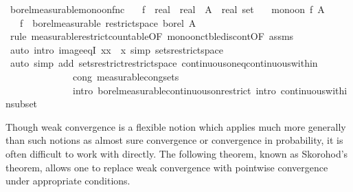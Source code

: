 \documentclass[leqno]{article}
\theoremstyle{definition}
\begin{document}
\medskip

\begin{isabellebody}
\isamarkupfalse%
\ borel{\isacharunderscore}measurable{\isacharunderscore}mono{\isacharunderscore}on{\isacharunderscore}fnc{\isacharcolon}\isanewline
\ \ \ f\ {\isacharcolon}{\isacharcolon}\ {\isachardoublequoteopen}real\ {\isasymRightarrow}\ real{\isachardoublequoteclose}\ \ A\ {\isacharcolon}{\isacharcolon}\ {\isachardoublequoteopen}real\ set{\isachardoublequoteclose}\isanewline
\ \ \ {\isachardoublequoteopen}mono{\isacharunderscore}on\ f\ A{\isachardoublequoteclose}\isanewline
\ \ \ {\isachardoublequoteopen}f\ {\isasymin}\ borel{\isacharunderscore}measurable\ {\isacharparenleft}restrict{\isacharunderscore}space\ borel\ A{\isacharparenright}{\isachardoublequoteclose}\isanewline
{}\isamarkupfalse%
\ {\isacharparenleft}rule\ measurable{\isacharunderscore}restrict{\isacharunderscore}countable{\isacharbrackleft}OF\ mono{\isacharunderscore}on{\isacharunderscore}ctble{\isacharunderscore}discont{\isacharbrackleft}OF\ assms{\isacharbrackright}{\isacharbrackright}{\isacharparenright}\isanewline
\ \ \isamarkupfalse%
\ {\isacharparenleft}auto\ intro{\isacharbang}{\isacharcolon}\ image{\isacharunderscore}eqI{\isacharbrackleft}\ x{\isacharequal}{\isachardoublequoteopen}{\isacharbraceleft}x{\isacharbraceright}{\isachardoublequoteclose}\ \ x{\isacharbrackright}\ simp{\isacharcolon}\ sets{\isacharunderscore}restrict{\isacharunderscore}space{\isacharparenright}\isanewline
\ \ \isamarkupfalse%
\ {\isacharparenleft}auto\ simp\ add{\isacharcolon}\ sets{\isacharunderscore}restrict{\isacharunderscore}restrict{\isacharunderscore}space\ continuous{\isacharunderscore}on{\isacharunderscore}eq{\isacharunderscore}continuous{\isacharunderscore}within\isanewline
\ \ \ \ \ \ \ \ \ \ \ \ \ \ cong{\isacharcolon}\ measurable{\isacharunderscore}cong{\isacharunderscore}sets\ \isanewline
\ \ \ \ \ \ \ \ \ \ \ \ \ \ intro{\isacharbang}{\isacharcolon}\ borel{\isacharunderscore}measurable{\isacharunderscore}continuous{\isacharunderscore}on{\isacharunderscore}restrict\ intro{\isacharcolon}\ continuous{\isacharunderscore}within{\isacharunderscore}subset{\isacharparenright}\isanewline
\ \ \isamarkupfalse%
\end{isabellebody}

\medskip

Though weak convergence is a flexible notion which applies much more generally than such notions as almost sure convergence or convergence in probability, it is often difficult to work with directly. The following theorem, known as Skorohod's theorem, allows one to replace weak convergence with pointwise convergence under appropriate conditions.
\end{document}
